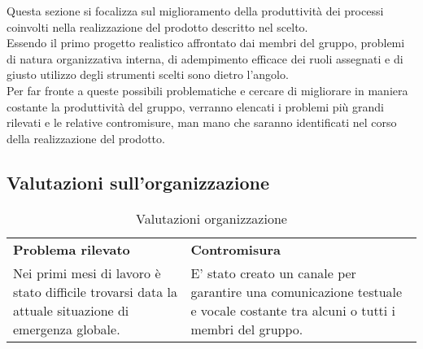Questa sezione si focalizza sul miglioramento della produttività dei processi coinvolti nella realizzazione del prodotto descritto nel  scelto. \\
Essendo il primo progetto realistico affrontato dai membri del gruppo, problemi di natura organizzativa interna, di adempimento efficace dei ruoli assegnati e di giusto utilizzo degli strumenti scelti sono dietro l’angolo.\\ 
 Per far fronte a queste possibili problematiche e cercare di migliorare in maniera costante la produttività del gruppo, verranno elencati i problemi più grandi rilevati e le relative contromisure, man mano che saranno identificati nel corso della realizzazione del prodotto.

\subsection{Valutazioni sull'organizzazione}
\begin{table} [h!]
	\begin{center}
		\begin{tabular} { m{8cm} m{8cm}  }
			\rowcolor{lightgray}
			\textbf{Problema rilevato} & \textbf{Contromisura}\\
			Nei primi mesi di lavoro è stato difficile trovarsi data la attuale situazione di emergenza globale. & E' stato creato un canale \glock{discord} per garantire una comunicazione testuale e vocale costante tra alcuni o tutti i membri del gruppo.
			
		\end{tabular}
	\end{center}
	\caption{Valutazioni organizzazione}
\end{table}


